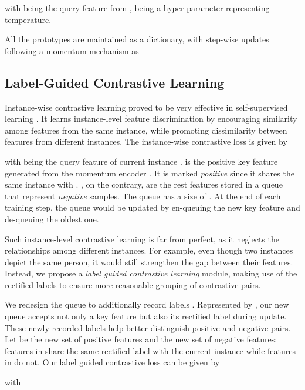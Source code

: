 \documentclass[10pt,twocolumn,letterpaper]{article}
\begin{document}
with  being the query feature from ,  being a hyper-parameter representing temperature. 

All the prototypes are maintained as a dictionary, with step-wise updates following a momentum mechanism as 





\subsection{Label-Guided Contrastive Learning}
\label{ssec:ccl}


Instance-wise contrastive learning proved to be very effective in self-supervised learning \cite{he2020momentum,chen2020mocov2,chen2020simple,chen2020big,grill2020bootstrap}.
It learns instance-level feature discrimination by encouraging similarity among features from the same instance, while promoting dissimilarity between features from different instances. 
The instance-wise contrastive loss is given by




with  being the query feature of current instance . 
 is the positive key feature generated from the momentum encoder . It is marked \emph{positive} since it shares the same instance with .
, on the contrary, are the rest features stored in a queue that represent \emph{negative} samples. 
The queue has a size of . At the end of each training step, the queue would be updated by en-queuing the new key feature and de-queuing the oldest one.

Such instance-level contrastive learning is far from perfect, as it neglects the relationships among different instances. 
For example, even though two instances depict the same person, it would still strengthen the gap between their features.
Instead, we propose a \emph{label guided contrastive learning} module, making use of the rectified labels  to ensure more reasonable grouping of contrastive pairs.

We redesign the queue to additionally record labels . 
Represented by , our new queue accepts not only a key feature  but also its rectified label  during update.
These newly recorded labels help better distinguish positive and negative pairs.
Let  be the new set of positive features and  the new set of negative features: features in  share the same rectified label with the current instance  while features in  do not.
Our label guided contrastive loss can be given by


with 
\end{document}
